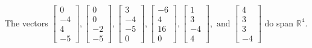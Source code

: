 \begin{exercise}
\begin{exerciseStatement}
  \end{exerciseStatement}
  \begin{exerciseAnswer}
   The vectors \(\left[\begin{array}{r}
0 \\
-4 \\
4 \\
-5
\end{array}\right] , \left[\begin{array}{r}
0 \\
0 \\
-2 \\
-5
\end{array}\right] , \left[\begin{array}{r}
3 \\
-4 \\
-5 \\
0
\end{array}\right] , \left[\begin{array}{r}
-6 \\
4 \\
16 \\
0
\end{array}\right] , \left[\begin{array}{r}
1 \\
3 \\
-4 \\
4
\end{array}\right] , \text{ and } \left[\begin{array}{r}
4 \\
3 \\
3 \\
-4
\end{array}\right]\) 
  	 do  
	span \(\mathbb{R}^4\).
  


  \end{exerciseAnswer}
\end{exercise}